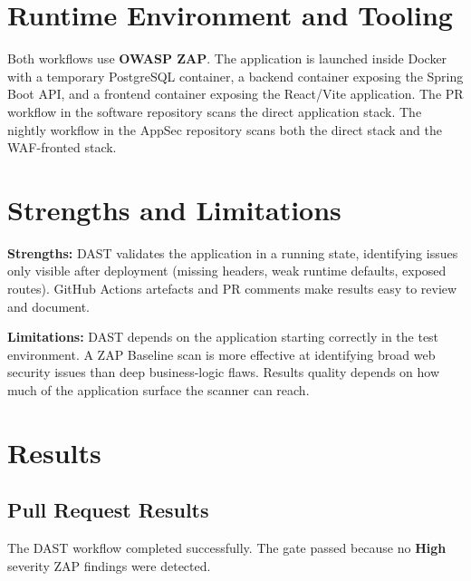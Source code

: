 \documentclass[12pt,a4paper]{report}
\begin{document}
\section{Runtime Environment and Tooling}

Both workflows use \textbf{OWASP ZAP}. The application is launched inside Docker with a temporary PostgreSQL container, a backend container exposing the Spring Boot API, and a frontend container exposing the React/Vite application. The PR workflow in the software repository scans the direct application stack. The nightly workflow in the AppSec repository scans both the direct stack and the WAF-fronted stack.

\section{Strengths and Limitations}

\textbf{Strengths:} DAST validates the application in a running state, identifying issues only visible after deployment (missing headers, weak runtime defaults, exposed routes). GitHub Actions artefacts and PR comments make results easy to review and document.

\textbf{Limitations:} DAST depends on the application starting correctly in the test environment. A ZAP Baseline scan is more effective at identifying broad web security issues than deep business-logic flaws. Results quality depends on how much of the application surface the scanner can reach.

\section{Results}

\subsection{Pull Request Results}

The DAST workflow completed successfully. The gate passed because no \textbf{High} severity ZAP findings were detected.
\end{document}
